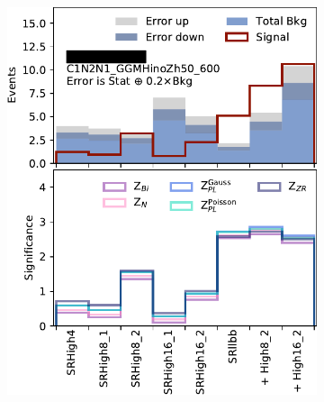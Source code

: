 \begin{figure}[tp]
\centering
\begin{subfigure}{0.48\textwidth}
\centering
\includegraphics[width=\textwidth]{figures/2ljets_disco_llbb_C1N2N1_GGMHinoZh50_600.png}
\caption{}
\end{subfigure}
\hfill
\begin{subfigure}{0.48\textwidth}
\centering

\end{subfigure}
\end{figure}
